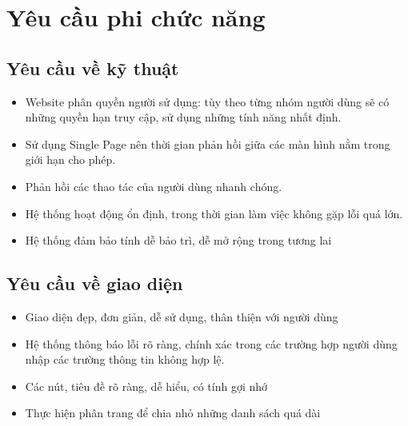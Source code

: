 \documentclass[../DoAn.tex]{subfiles}
\begin{document}
\section{Yêu cầu phi chức năng}
\label{section:2.4}
\subsection{Yêu cầu về kỹ thuật}
\label{subsection:2.4.1}
\begin{itemize}
    \item Website phân quyền người sử dụng: tùy theo từng nhóm người dùng sẽ có những quyền hạn truy cập, sử dụng những tính năng nhất định. 
    \item Sử dụng Single Page nên thời gian phản hồi giữa các màn hình nằm trong giới hạn cho phép.
    \item Phản hồi các thao tác của người dùng nhanh chóng.
    \item Hệ thống hoạt động ổn định, trong thời gian làm việc không gặp lỗi quá lớn.
    \item Hệ thống đảm bảo tính dễ bảo trì, dễ mở rộng trong tương lai
\end{itemize}
\subsection{Yêu cầu về giao diện}
\label{subsection:2.4.2}
\begin{itemize}
    \item Giao diện đẹp, đơn giản, dễ sử dụng, thân thiện với người dùng
    \item Hệ thống thông báo lỗi rõ ràng, chính xác trong các trường hợp người dùng nhập các trường thông tin không hợp lệ.
    \item Các nút, tiêu đề rõ ràng, dễ hiểu, có tính gợi nhớ
    \item Thực hiện phân trang để chia nhỏ những danh sách quá dài
\end{itemize}

\end{document}
